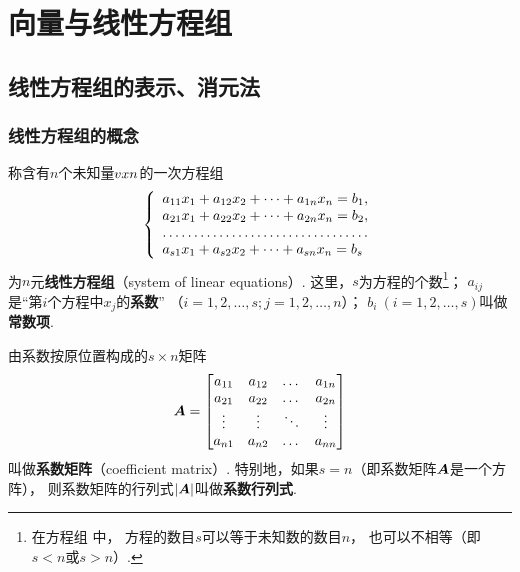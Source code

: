 \chapter{向量与线性方程组}
\section{线性方程组的表示、消元法}
\subsection{线性方程组的概念}
\begin{definition}
称含有\(n\)个未知量\(v{x}{n}\)的一次方程组
\begin{equation}\label{equation:线性方程组.线性方程组的代数形式}
\left\{ \begin{array}{l}
a_{11} x_1 + a_{12} x_2 + \dotsb + a_{1n} x_n = b_1, \\
a_{21} x_1 + a_{22} x_2 + \dotsb + a_{2n} x_n = b_2, \\
\hdotsfor{1} \\
a_{s1} x_1 + a_{s2} x_2 + \dotsb + a_{sn} x_n = b_s
\end{array} \right.
\end{equation}
为\(n\)元\textbf{线性方程组}（system of linear equations）.
这里，\(s\)为方程的个数\footnote{%
在方程组 中，%
方程的数目\(s\)可以等于未知数的数目\(n\)，%
也可以不相等（即\(s<n\)或\(s>n\)）.
}；%
\(a_{ij}\)是“第\(i\)个方程中\(x_j\)的\textbf{系数}”%
（\(i=1,2,\dotsc,s; \allowbreak
j=1,2,\dotsc,n\)）；
\(b_i\ (i=1,2,\dotsc,s)\)叫做\textbf{常数项}.
\end{definition}

\begin{definition}
由系数按原位置构成的\(s \times n\)矩阵\[
\boldsymbol{A} = \begin{bmatrix}
a_{11} & a_{12} & \dots & a_{1n} \\
a_{21} & a_{22} & \dots & a_{2n} \\
\vdots & \vdots & \ddots & \vdots \\
a_{n1} & a_{n2} & \dots & a_{nn}
\end{bmatrix}
\]叫做\textbf{系数矩阵}（coefficient matrix）.
特别地，如果\(s = n\)（即系数矩阵\(\boldsymbol{A}\)是一个方阵），%
则系数矩阵的行列式\(\abs{\boldsymbol{A}}\)叫做\textbf{系数行列式}.
\end{definition}

